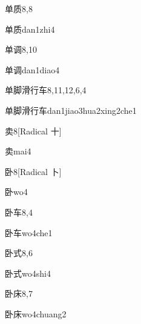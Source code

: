 \begin{entry}{单质}{8,8}
  \begin{phonetics}{单质}{dan1zhi4}
  \end{phonetics}
\end{entry}

\begin{entry}{单调}{8,10}
  \begin{phonetics}{单调}{dan1diao4}
  \end{phonetics}
\end{entry}

\begin{entry}{单脚滑行车}{8,11,12,6,4}
  \begin{phonetics}{单脚滑行车}{dan1jiao3hua2xing2che1}
  \end{phonetics}
\end{entry}

\begin{entry}{卖}{8}[Radical 十]
  \begin{phonetics}{卖}{mai4}
  \end{phonetics}
\end{entry}

\begin{entry}{卧}{8}[Radical 卜]
  \begin{phonetics}{卧}{wo4}
  \end{phonetics}
\end{entry}

\begin{entry}{卧车}{8,4}
  \begin{phonetics}{卧车}{wo4che1}
  \end{phonetics}
\end{entry}

\begin{entry}{卧式}{8,6}
  \begin{phonetics}{卧式}{wo4shi4}
  \end{phonetics}
\end{entry}

\begin{entry}{卧床}{8,7}
  \begin{phonetics}{卧床}{wo4chuang2}
  \end{phonetics}
\end{entry}

